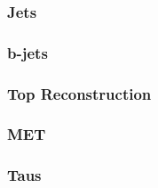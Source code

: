 \subsubsection{Jets} \label{sec:Jets} 

\subsubsection{b-jets} \label{sec:b-jets} 

\subsubsection{Top Reconstruction} \label{sec:top} 

\subsubsection{MET} \label{sec:MET} 

\subsubsection{Taus} \label{sec:taus} 

